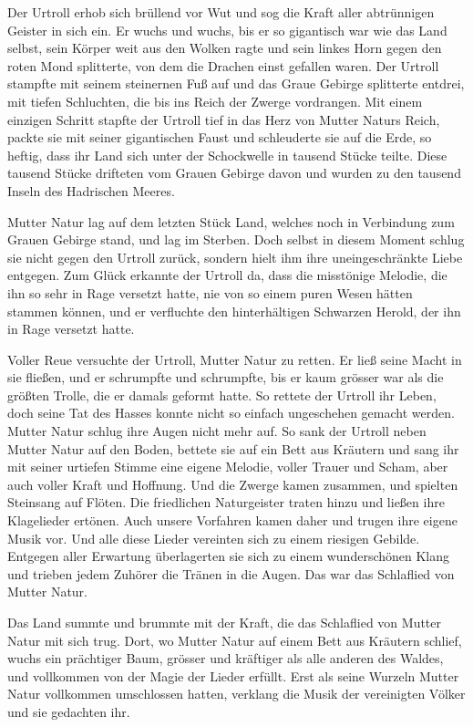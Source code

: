 \documentclass[10pt, a4paper, oneside]{book}
\begin{document}
Der Urtroll erhob sich brüllend vor Wut und sog die Kraft aller abtrünnigen Geister in sich ein. Er wuchs und wuchs, bis er so gigantisch war wie das Land selbst, sein Körper weit aus den Wolken ragte und sein linkes Horn gegen den roten Mond splitterte, von dem die Drachen einst gefallen waren. Der Urtroll stampfte mit seinem steinernen Fuß auf und das Graue Gebirge splitterte entdrei, mit tiefen Schluchten, die bis ins Reich der Zwerge vordrangen. Mit einem einzigen Schritt stapfte der Urtroll tief in das Herz von Mutter Naturs Reich, packte sie mit seiner gigantischen Faust und schleuderte sie auf die Erde, so heftig, dass ihr Land sich unter der Schockwelle in tausend Stücke teilte. Diese tausend Stücke drifteten vom Grauen Gebirge davon und wurden zu den tausend Inseln des Hadrischen Meeres.

Mutter Natur lag auf dem letzten Stück Land, welches noch in Verbindung zum Grauen Gebirge stand, und lag im Sterben. Doch selbst in diesem Moment schlug sie nicht gegen den Urtroll zurück, sondern hielt ihm ihre uneingeschränkte Liebe entgegen. Zum Glück erkannte der Urtroll da, dass die misstönige Melodie, die ihn so sehr in Rage versetzt hatte, nie von so einem puren Wesen hätten stammen können, und er verfluchte den hinterhältigen Schwarzen Herold, der ihn in Rage versetzt hatte.

Voller Reue versuchte der Urtroll, Mutter Natur zu retten. Er ließ seine Macht in sie fließen, und er schrumpfte und schrumpfte, bis er kaum grösser war als die größten Trolle, die er damals geformt hatte. So rettete der Urtroll ihr Leben, doch seine Tat des Hasses konnte nicht so einfach ungeschehen gemacht werden. Mutter Natur schlug ihre Augen nicht mehr auf. So sank der Urtroll neben Mutter Natur auf den Boden, bettete sie auf ein Bett aus Kräutern und sang ihr mit seiner urtiefen Stimme eine eigene Melodie, voller Trauer und Scham, aber auch voller Kraft und Hoffnung. Und die Zwerge kamen zusammen, und spielten Steinsang auf Flöten. Die friedlichen Naturgeister traten hinzu und ließen ihre Klagelieder ertönen. Auch unsere Vorfahren kamen daher und trugen ihre eigene Musik vor. Und alle diese Lieder vereinten sich zu einem riesigen Gebilde. Entgegen aller Erwartung überlagerten sie sich zu einem wunderschönen Klang und trieben jedem Zuhörer die Tränen in die Augen. Das war das Schlaflied von Mutter Natur.

Das Land summte und brummte mit der Kraft, die das Schlaflied von Mutter Natur mit sich trug. Dort, wo Mutter Natur auf einem Bett aus Kräutern schlief, wuchs ein prächtiger Baum, grösser und kräftiger als alle anderen des Waldes, und vollkommen von der Magie der Lieder erfüllt. Erst als seine Wurzeln Mutter Natur vollkommen umschlossen hatten, verklang die Musik der vereinigten Völker und sie gedachten ihr.
\end{document}
